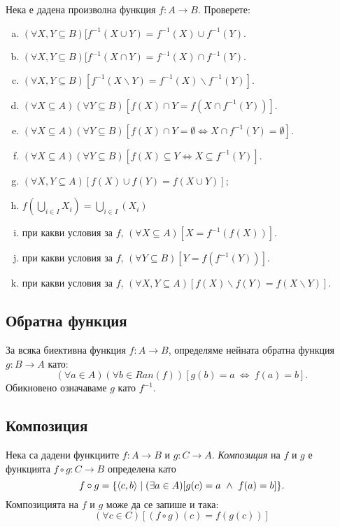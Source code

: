 \begin{problem}
  Нека е дадена произволна функция $f:A \to B$.
  Проверете:
  \begin{enumerate}[a)]
  \item
    $(\forall X,Y \subseteq B)[f^{-1}(X\cup Y) = f^{-1}(X)\cup f^{-1}(Y)$.
  \item
    $(\forall X,Y \subseteq B)[f^{-1}(X\cap Y) = f^{-1}(X)\cap f^{-1}(Y)$.
  \item
    $(\forall X,Y \subseteq B)[f^{-1}(X\backslash Y) = f^{-1}(X)\backslash f^{-1}(Y)]$.
  \item
    $(\forall X\subseteq A)(\forall Y\subseteq B)[f(X)\cap Y = f(X\cap f^{-1}(Y))]$.
  \item
    $(\forall X \subseteq A)(\forall Y \subseteq B)[f(X)\cap Y = \emptyset \iff X\cap f^{-1}(Y) = \emptyset]$.
  \item
    $(\forall X \subseteq A)(\forall Y \subseteq B)[f(X)\subseteq Y \iff X\subseteq f^{-1}(Y)]$.
  \item
    $(\forall X,Y \subseteq A)[f(X)\cup f(Y) = f(X\cup Y)]$;
  \item
    $f(\bigcup_{i\in I}X_i) = \bigcup_{i\in I}(X_i)$
  \item
    при какви условия за $f$,
    $(\forall X\subseteq A)[X =  f^{-1}(f(X))]$.
  \item
    при какви условия за $f$,
    $(\forall Y \subseteq B)[Y = f(f^{-1}(Y))]$.
  \item
    при какви условия за $f$,
    $(\forall X,Y \subseteq A)[f(X)\backslash f(Y) = f(X\backslash Y)]$.
  \end{enumerate}
\end{problem}

\newpage

\subsection*{Обратна функция}

За всяка биективна функция $f:A\to B$, определяме нейната обратна функция $g:B \to  A$ като:
\[(\forall a \in A)(\forall b \in Ran(f))[g(b) = a\ \iff\ f(a) = b].\]
Обикновено означаваме $g$ като $f^{-1}$.

\subsection*{Композиция}

Нека са дадени функциите $f:A\to B$ и $g:C\to A$.
{\em Композиция} на $f$ и $g$ е функцията $f\circ g: C \to B$ определена като
\[f\circ g = \{\langle{c,b}\rangle\mid (\exists a\in A)[g(c) = a\ \wedge\ f(a) = b]\}.\]
Композицията на $f$ и $g$ може да се запише и така:
\[(\forall c\in C)[(f\circ g)(c) = f(g(c))]\]

